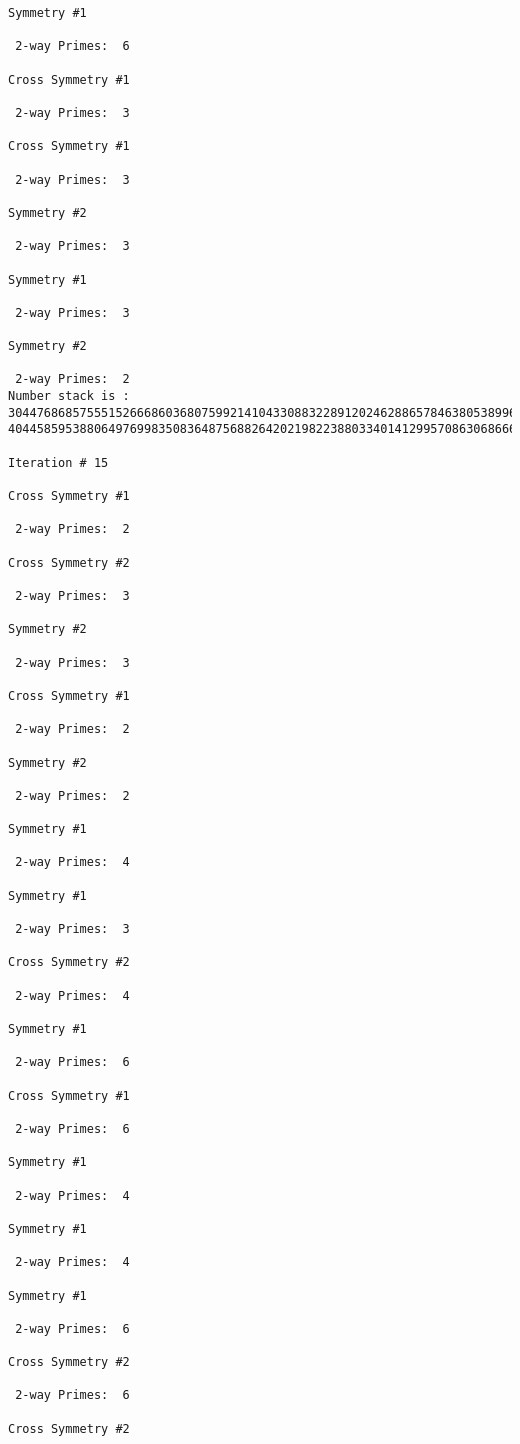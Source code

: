 \begin{verbatim}
Symmetry #1

 2-way Primes: 	6

Cross Symmetry #1

 2-way Primes: 	3

Cross Symmetry #1

 2-way Primes: 	3

Symmetry #2

 2-way Primes: 	3

Symmetry #1

 2-way Primes: 	3

Symmetry #2

 2-way Primes: 	2
Number stack is :
30447686857555152666860368075992141043308832289120246288657846380538996794608835958544046240163340857
40445859538806497699835083648756882642021982238803340141299570863068666251555758686744037580433610426

Iteration #	15

Cross Symmetry #1

 2-way Primes: 	2

Cross Symmetry #2

 2-way Primes: 	3

Symmetry #2

 2-way Primes: 	3

Cross Symmetry #1

 2-way Primes: 	2

Symmetry #2

 2-way Primes: 	2

Symmetry #1

 2-way Primes: 	4

Symmetry #1

 2-way Primes: 	3

Cross Symmetry #2

 2-way Primes: 	4

Symmetry #1

 2-way Primes: 	6

Cross Symmetry #1

 2-way Primes: 	6

Symmetry #1

 2-way Primes: 	4

Symmetry #1

 2-way Primes: 	4

Symmetry #1

 2-way Primes: 	6

Cross Symmetry #2

 2-way Primes: 	6

Cross Symmetry #2


\end{verbatim}
